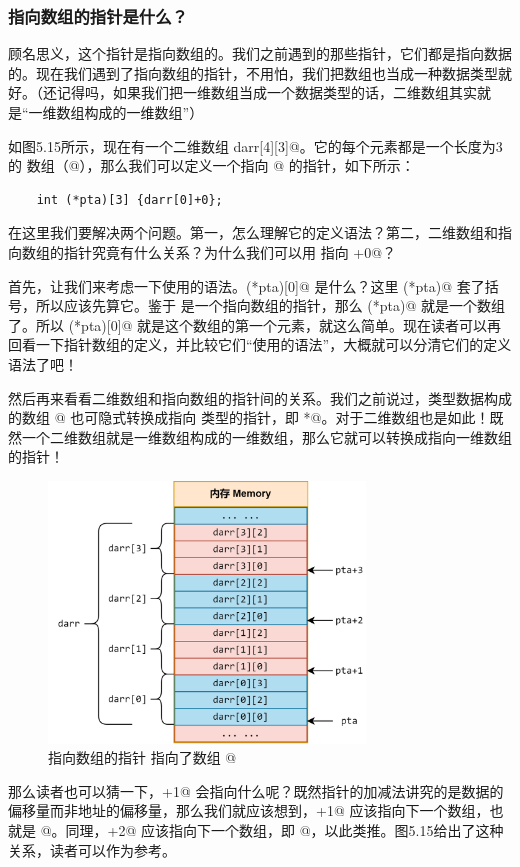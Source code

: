 \subsubsection*{指向数组的指针是什么？}
顾名思义，这个指针是指向数组的。我们之前遇到的那些指针，它们都是指向数据的。现在我们遇到了指向数组的指针，不用怕，我们把数组也当成一种数据类型就好。（还记得吗，如果我们把一维数组当成一个数据类型的话，二维数组其实就是``一维数组构成的一维数组''）\par
如图5.15所示，现在有一个二维数组 \lstinline@int darr[4][3]@。它的每个元素都是一个长度为3的 \lstinline@int@ 数组（\lstinline@int[3]@），那么我们可以定义一个指向 \lstinline@darr[0]@ 的指针，如下所示：
\begin{lstlisting}
    int (*pta)[3] {darr[0]+0};
\end{lstlisting}
在这里我们要解决两个问题。第一，怎么理解它的定义语法？第二，二维数组和指向数组的指针究竟有什么关系？为什么我们可以用 \lstinline@pta@ 指向 \lstinline@darr[0]+0@？\par
首先，让我们来考虑一下使用的语法。\lstinline@(*pta)[0]@ 是什么？这里 \lstinline@(*pta)@ 套了括号，所以应该先算它。鉴于 \lstinline@pta@ 是一个指向数组的指针，那么 \lstinline@(*pta)@ 就是一个数组了。所以 \lstinline@(*pta)[0]@ 就是这个数组的第一个元素，就这么简单。现在读者可以再回看一下指针数组的定义，并比较它们``使用的语法''，大概就可以分清它们的定义语法了吧！\par
然后再来看看二维数组和指向数组的指针间的关系。我们之前说过，\lstinline@T@ 类型数据构成的数组 \lstinline@T[N]@ 也可隐式转换成指向 \lstinline@T@ 类型的指针，即 \lstinline@T*@。对于二维数组也是如此！既然一个二维数组就是一维数组构成的一维数组，那么它就可以转换成指向一维数组的指针！\par
\begin{figure}[htbp]
    \centering
    \includegraphics[width=0.75\textwidth]{../images/generalized_parts/05_the_pointer_to_array_and_2d_array_300.png}
    \caption{指向数组的指针 \lstinline@pta@ 指向了数组 \lstinline@darr[0]@}
\end{figure}
那么读者也可以猜一下，\lstinline@pta+1@ 会指向什么呢？既然指针的加减法讲究的是数据的偏移量而非地址的偏移量，那么我们就应该想到，\lstinline@pta+1@ 应该指向下一个数组，也就是 \lstinline@darr[1]@。同理，\lstinline@pta+2@ 应该指向下一个数组，即 \lstinline@darr[2]@，以此类推。图5.15给出了这种关系，读者可以作为参考。\par

